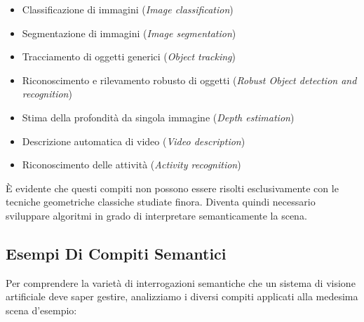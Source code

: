 ﻿\documentclass[11pt, a4paper]{article}
\begin{document}
\begin{itemize}
    \item Classificazione di immagini (\emph{Image classification})
    \item Segmentazione di immagini (\emph{Image segmentation})
    \item Tracciamento di oggetti generici (\emph{Object tracking})
    \item Riconoscimento e rilevamento robusto di oggetti (\emph{Robust Object detection and recognition})
    \item Stima della profondità da singola immagine (\emph{Depth estimation})
    \item Descrizione automatica di video (\emph{Video description})
    \item Riconoscimento delle attività (\emph{Activity recognition})
\end{itemize}

È evidente che questi compiti non possono essere risolti esclusivamente con le tecniche geometriche classiche studiate finora. Diventa quindi necessario sviluppare algoritmi in grado di interpretare semanticamente la scena.


\subsection{Esempi Di Compiti Semantici}

Per comprendere la varietà di interrogazioni semantiche che un sistema di visione artificiale deve saper gestire, analizziamo i diversi compiti applicati alla medesima scena d'esempio:
\end{document}
